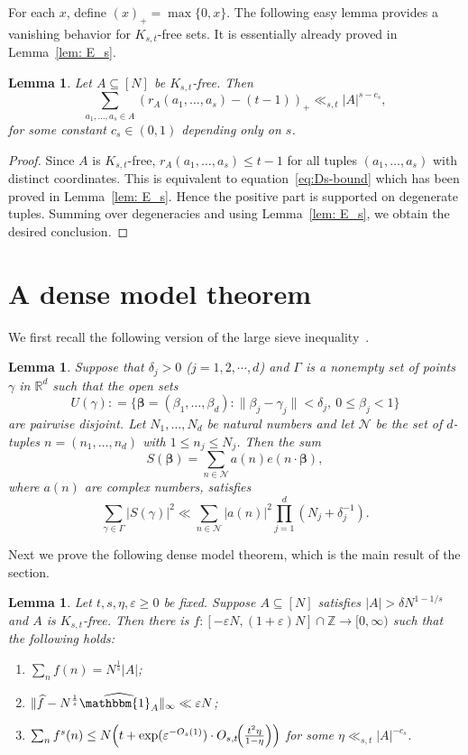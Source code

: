 \documentclass[A4paper,reqno,oneside,12pt]{amsart}
\theoremstyle{plain}
\newtheorem{lemma}[theorem]{Lemma}
\theoremstyle{definition}
\newcommand{\e}{\mathbbm{1}}          %
\newcommand{\Z}{\mathbb{Z}}
\newcommand{\R}{\mathbb{R}}
\newcommand{\ee}{\varepsilon}
\begin{document}
For each $x$, define $(x)_+=\max\{0,x\}$. The following easy lemma provides a vanishing behavior for $K_{s,t}$-free sets. It is essentially already proved in Lemma~\ref{lem: E_s}. 

\begin{lemma}\label{lem: vanishing K_st-free}
Let $A\subseteq[N]$ be $K_{s,t}$-free. Then\[
\sum_{a_1,\dots,a_s\in A} (r_A(a_1,\dots,a_s) - (t-1))_+\ll_{s,t}|A|^{s-c_s},
\]
for some constant $c_s\in(0,1)$ depending only on $s$. 
\end{lemma}
\begin{proof}
    Since $A$ is $K_{s,t}$-free, $r_A(a_1,\dots,a_s)\leq t-1$ for all tuples $(a_1,\dots,a_s)$ with distinct coordinates. This is equivalent to equation~\eqref{eq:Ds-bound} which has been proved in Lemma~\ref{lem: E_s}. Hence the positive part is supported on degenerate tuples. Summing over degeneracies and using Lemma~\ref{lem: E_s}, we obtain the desired conclusion. 
\end{proof}



\section{A dense model theorem}\label{sec:dense-model}
We first recall the following version of the large sieve inequality~\cite{Vau}.

\begin{lemma}\label{lem: sieve}
Suppose that $\delta_j>0$ ($j=1,2,\cdots, d$) and $\Gamma$ is a nonempty set of points $\gamma$ in $\R^{d}$ such that the open sets 
\[
U(\gamma) : = \{\boldsymbol{\beta}=(\beta_1,\dots,\beta_d): \|\beta_j-\gamma_j\|<\delta_j,\ 0\le \beta_j<1 \}
\]
are pairwise disjoint. Let $N_1,\dots,N_{d}$ be natural numbers and let $\mathcal{N}$ be the set of $d$-tuples $n = (n_1, \dots, n_{d})$ with $1\le n_j \le N_j$. Then the sum 
\[
S(\boldsymbol{\beta}) = \sum_{n\in \mathcal{N}}  a(n)e(n\cdot\boldsymbol{\beta}),
\]
where $a(n)$ are complex numbers, satisfies
\[
\sum_{\gamma \in \Gamma } |S(\gamma)|^{2} \ll \sum_{n \in \mathcal{N}} |a(n)|^{2} \prod_{j=1}^{d} (N_j + \delta_j^{-1}).
\]
\end{lemma}

Next we prove the following dense model theorem, which is the main result of the section. 

\begin{lemma}\label{lem: dense model kst} Let $t, s, \eta, \ee\ge 0$ be fixed.
Suppose $A\subseteq [N]$ satisfies $|A|>\delta N^{1-1/s}$ and $A$ is $K_{s,t}$-free. 
Then there is $f:[-\varepsilon N, (1+\varepsilon)N]\cap\Z\to[0,\infty)$ such that the following holds:
\begin{enumerate}[label=(\roman*)]
    \item $\sum_n f(n)= N^{\frac{1}{s}}|A| $;
    \item $\| \widehat{f}-N^{\frac{1}{s}} \widehat{\e_A}\|_\infty\ll \varepsilon N$;
    \item $\sum_n f^s(n)\leq N\Bigl(t+\exp(\varepsilon^{-O_s(1)})\cdot O_{s,t}\!\Bigl(\frac{t^2\eta}{1-\eta}\Bigr)\Bigr)$ for some $\eta\ll_{s,t}|A|^{-c_s}$.
\end{enumerate}
\end{lemma}
\end{document}
